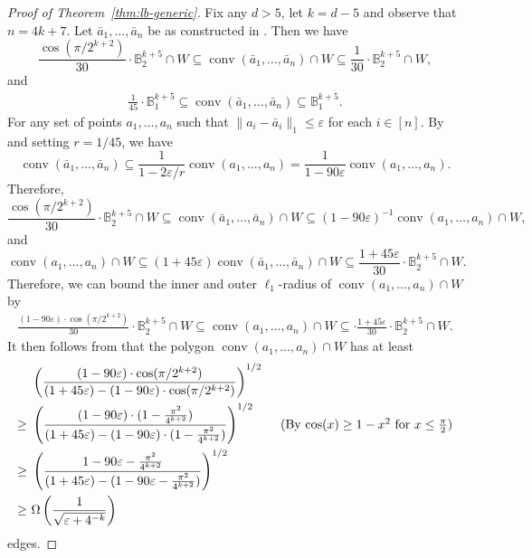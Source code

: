 \documentclass{article}\usepackage[a4paper,margin=20mm]{geometry}
\newcommand{\eps}{\varepsilon} %
\newcommand{\conv}{\operatorname{conv}}
\newcommand{\ball}{\mathbb{B}_2}
\renewcommand{\subset}{\subseteq}
\begin{document}
\begin{proof}[Proof of Theorem~\ref{thm:lb-generic}]
Fix any $d > 5$, let $k = d-5$ and observe that $n = 4k+7$. Let $\bar a_1,\ldots,\bar a_{n}$ be as constructed in . Then we have
\[
\frac{\cos(\pi/2^{k+2})}{30} \cdot \ball^{k+5} \cap W \subset \conv(\bar{a}_1, \ldots, \bar{a}_n) \cap W \subset \frac{1}{30}\cdot \ball^{k+5}\cap W ,
\]
and
\begin{align*}
    \frac{1}{45} \cdot \mathbb B_1^{k+5} \subset \conv(\bar{a}_1, \ldots, \bar{a}_n) \subset \mathbb B_1^{k+5} .
\end{align*}
For any set of points $a_1, \ldots, a_n$ such that $\|a_i - \bar{a}_i\|_1 \leq \eps$ for each $i \in [n]$. By  and setting $r = 1/45$, we have
\[
    \conv(\bar{a}_1, \ldots, \bar{a}_n) \subseteq \frac{1}{1 - 2\eps / r} \conv(a_1, \ldots, a_n) = \frac{1}{1 - 90 \eps} \conv(a_1,\ldots,a_n).
\]
Therefore,
\[
    \frac{\cos(\pi/2^{k+2})}{30} \cdot \ball^{k+5} \cap W \subset \conv(\bar a_1,\ldots,\bar a_n) \cap W \subset (1 - 90\eps)^{-1} \conv(a_1,\ldots,a_n)\cap W ,
\]
and 
\[
    \conv(a_1,\ldots,a_n) \cap W \subset (1+45\eps) \conv(\bar a_1,\ldots,\bar a_n) \cap W \subset \frac{1+45\eps }{30}\cdot \ball^{k+5}\cap W.
\]
Therefore, we can bound the inner and outer $\ell_1$-radius of $\conv(a_1, \ldots, a_n) \cap W$ by 
\begin{align*}
    \frac{(1 - 90\eps) \cdot \cos(\pi/2^{k+2})}{30} \cdot \ball^{k+5}\cap W \subseteq \conv(a_1, \ldots, a_n) \cap W \subseteq \cdot \frac{1+45\eps}{30} \cdot \ball^{k+5}\cap W .
\end{align*}
It then follows from  that the polygon $\conv(a_1,\ldots,a_n) \cap W$ has at least
\begin{align*}
    & \left( \frac{(1 - 90\eps) \cdot \cos(\pi/2^{k+2})}{(1+45\eps) - (1 - 90\eps) \cdot \cos(\pi/2^{k+2})} \right)^{1/2}  \\
    \geq ~ & \left( \frac{(1 - 90\eps) \cdot (1 - \frac{\pi^2}{4^{k+2}})}{(1+45\eps) - (1 - 90\eps) \cdot (1 - \frac{\pi^2}{4^{k+2}})} \right)^{1/2} \tag{By $\cos(x) \geq 1 - x^2$ for $x \leq \frac{\pi}{2}$} \\
    \geq ~ & \left( \frac{1 - 90\eps - \frac{\pi^2}{4^{k+2}}}{(1+45\eps) - (1 - 90\eps - \frac{\pi^2}{4^{k+2}})} \right)^{1/2}\\
    \geq ~ & \Omega \left(\frac{1}{\sqrt{\eps + 4^{-k}}} \right)
\end{align*}
edges.
\end{proof}
\end{document}
